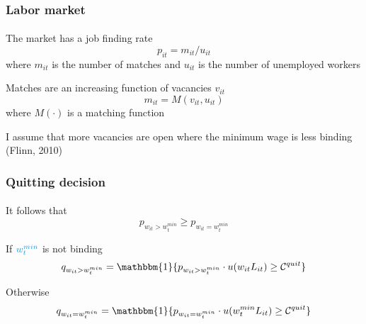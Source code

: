 \begin{frame}

    \frametitle{Labor market} %
    \framesubtitle{}  %
    \rmfamily %

    \begin{wideitemize}
        \item The market has a \textcolor{fblu}{job finding rate} 
        \[
            p_{it} = m_{it}/u_{it} 
        \]
        where \(m_{it}\) is the \textcolor{fblu}{number of matches} and \(u_{it}\) is the \textcolor{fblu}{number of unemployed workers}
        
        \item Matches are an increasing function of vacancies \(v_{it}\)
        \[
            m_{it} = M(v_{it}, u_{it})
        \]
        where \(M\left(\cdot \right) \) is a matching function
        \item I assume that more vacancies are open where the minimum wage is less binding ({\footnotesize  \textcolor{fgre}{Flinn, 2010}})
    \end{wideitemize}

\end{frame}


\begin{frame}

    \frametitle{Quitting decision} %
    \framesubtitle{}  %
    \rmfamily %

    \begin{wideitemize}
        \item It follows that
        \[
            p_{w_{it} > w^{min}_t} \geq p_{w_{it} = w^{min}_t}
        \]
        \vspace{-15pt}
        \item If \(\textcolor{fblu}{w^{min}_t}\) is not binding
        \[
            q_{w_{it} > w^{min}_t} = \mathbbm{1}\{p_{w_{it} > w^{min}_t}\cdot u(w_{it}L_{it}) \geq \mathcal{C}^{quit}\}
        \]
        \vspace{-15pt}
        \item Otherwise
        \[
            q_{w_{it} = w^{min}_t} = \mathbbm{1}\{p_{w_{it} = w^{min}_t}\cdot u(w^{min}_t L_{it}) \geq \mathcal{C}^{quit}\} 
        \]

    \end{wideitemize}
    
\end{frame}


